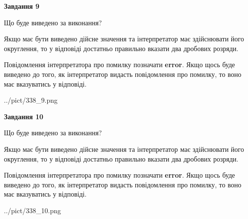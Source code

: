\documentclass[12pt, ukrainian]{article}
\begin{document}
{\begin {Large}
{\begin {center}\textbf{Завдання 9}\end {center}}\par
Що буде виведено за виконання? \par

Якщо має бути виведено дійсне значення та інтерпретатор має здійснювати його округлення, 
то у відповіді достатньо правильно вказати два дробових розряди.

Повідомлення інтерпретатора про помилку позначати \textbf{error}.
Якщо щось буде виведено до того, як інтерпретатор видасть повідомлення про помилку, 
то воно має вказуватись у відповіді. \par

\begin{center}
	{../pict/338_9.png}
\end{center}
\newpage

{\begin {center}\textbf{Завдання 10}\end {center}}\par
Що буде виведено за виконання? \par

Якщо має бути виведено дійсне значення та інтерпретатор має здійснювати його округлення, 
то у відповіді достатньо правильно вказати два дробових розряди.

Повідомлення інтерпретатора про помилку позначати \textbf{error}.
Якщо щось буде виведено до того, як інтерпретатор видасть повідомлення про помилку, 
то воно має вказуватись у відповіді. \par

\begin{center}
	{../pict/338_10.png}
\end{center}
\newpage

\end {Large}}
\end{document}
